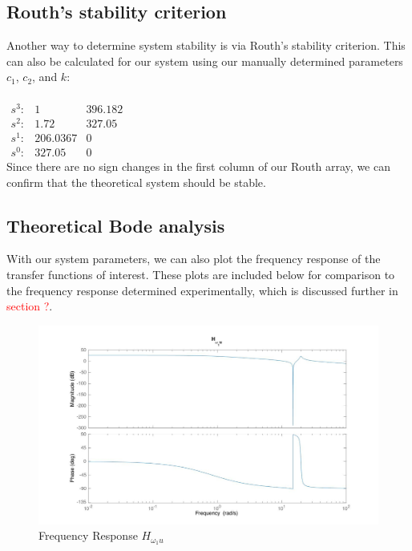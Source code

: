 \documentclass[11pt,titlepage]{article}
\begin{document}
	
	\subsection{Routh's stability criterion}
	Another way to determine system stability is via Routh's stability criterion. This can also be calculated for our system using our manually determined parameters $c_1$, $c_2$, and $k$:\\\\
	$\begin{matrix}
		s^3: & 1 & 396.182\\
		s^2: & 1.72 & 327.05\\
		s^1: & 206.0367 & 0\\
		s^0: & 327.05 & 0
	\end{matrix}$\\

Since there are no sign changes in the first column of our Routh array, we can confirm that the theoretical system should be stable.

	\subsection{Theoretical Bode analysis}
	With our system parameters, we can also plot the frequency response of the transfer functions of interest. These plots are included below for comparison to the frequency response determined experimentally, which is discussed further in \textcolor{red}{section ?}. 
	
	\begin{figure}[H]
            \centering
            \includegraphics[trim={6cm 0 1cm 1cm},clip,origin=c,scale=0.26]{w1_bode}
            \caption{Frequency Response $H_{\omega_{1}u}$}
            \label{fig:disc_sys}
       \end{figure}
       
\end{document}
